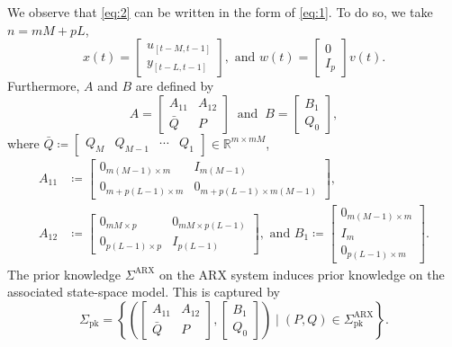 \documentclass[journal,twoside,web]{ieeecolor}
\newcommand{\set}[2]{\left\{#1 \mid #2\right\}}
\begin{document}
We observe that \eqref{eq:2} can be written in the form of \eqref{eq:1}. To do so, we take $n=mM+pL$, 
\begin{equation}
\label{eq:state_and_noise}
x(t)=\begin{bmatrix}
u_{[t-M,t-1]} \\ 
y_{[t-L,t-1]}
\end{bmatrix},\text{ and } w(t)=\begin{bmatrix}
0 \\
I_p
\end{bmatrix}v(t).
\end{equation}
Furthermore, $A$ and $B$ are defined by
\begin{equation}
\label{eq:state-space-rep}
A=\begin{bmatrix}
A_{11} & A_{12} \\
\bar{Q} & P
\end{bmatrix}\ \text{ and }\ B=\begin{bmatrix}
B_1 \\ 
Q_0
\end{bmatrix},
\end{equation}
where \mbox{$\bar{Q}\coloneqq \begin{bmatrix}
Q_M & Q_{M-1} & \cdots & Q_1
\end{bmatrix}\in\mathbb{R}^{m\times mM}$}, 
\begin{equation}
\begin{split}
A_{11}&\!\!\coloneqq\!\! \begin{bmatrix}
0_{m(M-1)\times m} & I_{m(M-1)} \\
0_{m+p(L-1)\times m} & 0_{m+p(L-1)\times m(M-1)}
\end{bmatrix},\\ A_{12}&\!\!\coloneqq\!\!\begin{bmatrix}
0_{mM\times p} \!\!\!&\!\!\! 0_{mM\times p(L-1)} \\
0_{p(L-1) \times p} \!\!\!&\!\!\! I_{p(L-1)}
\end{bmatrix},\text{ and } B_1\!\!\coloneqq\!\!\begin{bmatrix}
0_{m(M-1)\times m} \\ I_m \\ 0_{p(L-1)\times m}
\end{bmatrix}\!\!.
\end{split}
\end{equation} 
The prior knowledge $\Sigma^\text{ARX}$ on the ARX system induces prior knowledge on the associated state-space model. This is captured by
\begin{equation}
\Sigma_\text{pk}=\set{\left(\begin{bmatrix}
A_{11} & A_{12} \\
\bar{Q} & P
\end{bmatrix},\begin{bmatrix}
B_1 \\ 
Q_0
\end{bmatrix}\right)}{(P,Q)\in\Sigma_\text{pk}^\text{ARX}}.
\end{equation}
\end{document}
